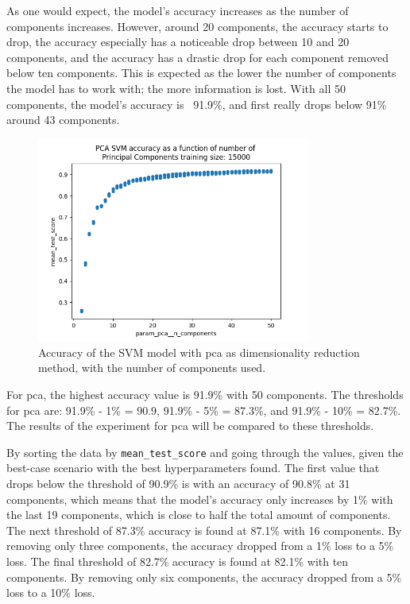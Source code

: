 As one would expect, the model's accuracy increases as the number of components increases. However, around 20 components, the accuracy starts to drop, the accuracy especially has a noticeable drop between 10 and 20 components, and the accuracy has a drastic drop for each component removed below ten components. This is expected as the lower the number of components the model has to work with; the more information is lost. With all 50 components, the model's accuracy is ~91.9\%, and first really drops below 91\% around 43 components.

\begin{figure}[htb!]
    \centering
    \includegraphics[width=0.8\textwidth]{figures/experiment_two/pca_svm_15000.png}
    \caption{Accuracy of the SVM model with \gls{pca} as dimensionality reduction method, with the number of components used.}
    \label{fig:experiment_2_pca_svm}
\end{figure}

For \gls{pca}, the highest accuracy value is 91.9\% with 50 components. The thresholds for \gls{pca} are: 91.9\% - 1\% = 90.9, 91.9\% - 5\% = 87.3\%, and 91.9\% - 10\% = 82.7\%. The results of the experiment for \gls{pca} will be compared to these thresholds.

By sorting the data by \texttt{mean\_test\_score} and going through the values, given the best-case scenario with the best hyperparameters found. The first value that drops below the threshold of 90.9\% is with an accuracy of 90.8\% at 31 components, which means that the model's accuracy only increases by 1\% with the last 19 components, which is close to half the total amount of components.
The next threshold of 87.3\% accuracy is found at 87.1\% with 16 components. By removing only three components, the accuracy dropped from a 1\% loss to a 5\% loss.
The final threshold of 82.7\% accuracy is found at 82.1\% with ten components. By removing only six components, the accuracy dropped from a 5\% loss to a 10\% loss.

